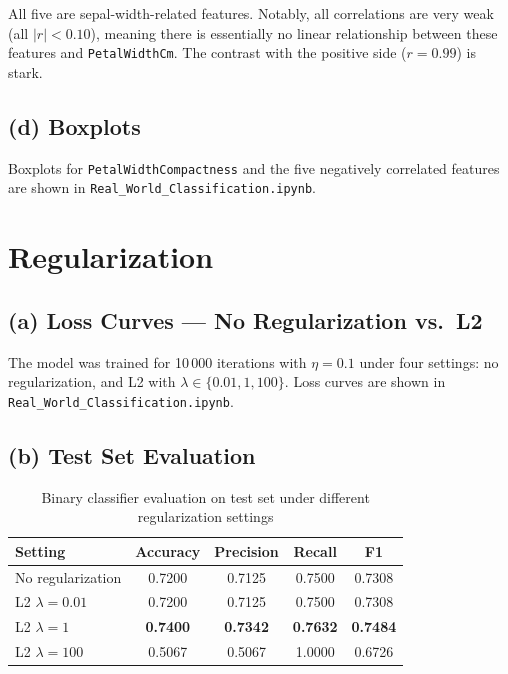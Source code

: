 \documentclass[11pt,a4paper]{article}
\begin{document}
All five are sepal-width-related features. Notably, all correlations are very weak (all $|r| < 0.10$), meaning there is essentially no linear relationship between these features and \texttt{PetalWidthCm}. The contrast with the positive side ($r = 0.99$) is stark.

\subsection{(d) Boxplots}

Boxplots for \texttt{PetalWidthCompactness} and the five negatively correlated features are shown in \texttt{Real\_World\_Classification.ipynb}.

\section{Regularization}

\subsection{(a) Loss Curves --- No Regularization vs.\ L2}

The model was trained for 10\,000 iterations with $\eta = 0.1$ under four settings: no regularization, and L2 with $\lambda \in \{0.01, 1, 100\}$. Loss curves are shown in \texttt{Real\_World\_Classification.ipynb}.

\subsection{(b) Test Set Evaluation}

\begin{table}[H]
\centering
\caption{Binary classifier evaluation on test set under different regularization settings}
\label{tab:reg_eval}
\begin{tabular}{lcccc}
\toprule
\textbf{Setting} & \textbf{Accuracy} & \textbf{Precision} & \textbf{Recall} & \textbf{F1} \\
\midrule
No regularization  & 0.7200 & 0.7125 & 0.7500 & 0.7308 \\
L2 $\lambda=0.01$  & 0.7200 & 0.7125 & 0.7500 & 0.7308 \\
L2 $\lambda=1$     & \textbf{0.7400} & \textbf{0.7342} & \textbf{0.7632} & \textbf{0.7484} \\
L2 $\lambda=100$   & 0.5067 & 0.5067 & 1.0000 & 0.6726 \\
\bottomrule
\end{tabular}
\end{table}
\end{document}
